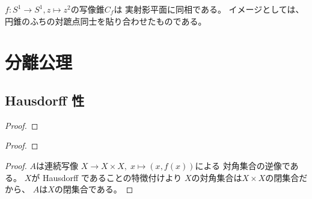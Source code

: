 \documentclass[report]{jlreq}
\begin{document}
\begin{example}[写像錐の例]
    $f \colon S^1 \to S^1, z \mapsto z^2$の写像錐$C_f$は
    実射影平面に同相である。
    イメージとしては、円錐のふちの対蹠点同士を貼り合わせたものである。
    \TODO{}
\end{example}



%
\chapter{分離公理}

%
\section{Hausdorff 性}

\begin{definition}[Hausdorff]
    \TODO{}
\end{definition}

\begin{proposition}
    \TODO{}
\end{proposition}

\begin{proof}
    \TODO{}
\end{proof}

\begin{theorem}
    \TODO{}
\end{theorem}

\begin{proof}
    \TODO{}
\end{proof}


\begin{proof}
    $A$は連続写像
    $X \to X \times X, \; x \mapsto (x, f(x))$による
    対角集合の逆像である。
    $X$が Hausdorff であることの特徴付けより
    $X$の対角集合は$X \times X$の閉集合だから、
    $A$は$X$の閉集合である。
\end{proof}
\end{document}
